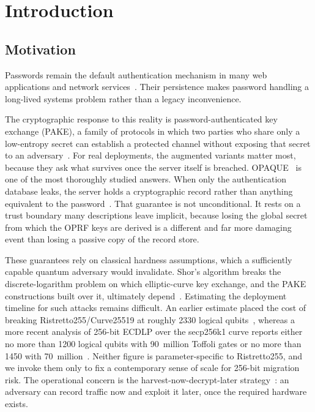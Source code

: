 \documentclass[preprint,12pt]{elsarticle}
\newcommand{\codeid}[1]{\textsf{#1}}
\theoremstyle{remark}
\begin{document}
\section{Introduction}

\subsection{Motivation}

Passwords remain the default authentication mechanism in many web applications
and network services~\cite{bonneau2012,florencio2007}. Their persistence makes
password handling a long-lived systems problem rather than a legacy inconvenience.

The cryptographic response to this reality is password-authenticated key
exchange (PAKE), a family of protocols in which two parties who share only a
low-entropy secret can establish a protected channel without exposing that
secret to an adversary~\cite{bellare2000}. For real deployments, the augmented
variants matter most, because they ask what survives once the server itself is
breached. OPAQUE~\cite{jarecki2018} is one of the most thoroughly studied
answers. When only the authentication database leaks, the server holds a
cryptographic record rather than anything equivalent to the password~\cite{ietf-opaque}.
That guarantee is not unconditional. It rests on a trust boundary many
descriptions leave implicit, because losing the global secret from which the
OPRF keys are derived is a different and far more damaging event than losing a
passive copy of the record store.

These guarantees rely on classical hardness assumptions, which a sufficiently
capable quantum adversary would invalidate. Shor's algorithm breaks the
discrete-logarithm problem on which elliptic-curve key exchange, and the PAKE
constructions built over it, ultimately depend~\cite{shor1994,bernstein2017}.
Estimating the deployment timeline for such attacks remains difficult. An
earlier estimate placed the cost of breaking Ristretto255/Curve25519 at roughly
2330 logical qubits~\cite{roetteler2017}, whereas a more recent analysis of
256-bit ECDLP over the \codeid{secp256k1} curve reports either no more than
1200 logical qubits with 90~million Toffoli gates or no more than 1450 with
70~million~\cite{babbush2026}. Neither figure is parameter-specific to
Ristretto255, and we invoke them only to fix a contemporary sense of scale for
256-bit migration risk. The operational concern is the
harvest-now-decrypt-later strategy~\cite{mosca2018}: an adversary can record
traffic now and exploit it later, once the required hardware exists.
\end{document}

